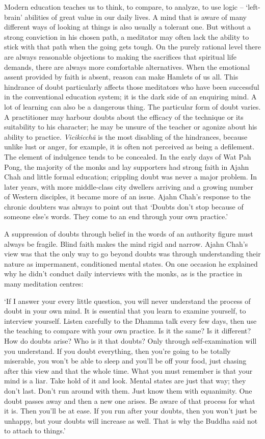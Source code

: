 Modern education teaches us to think, to compare, to analyze, to use
logic -- `left-brain' abilities of great value in our daily lives. A
mind that is aware of many different ways of looking at things is also
usually a tolerant one. But without a strong conviction in his chosen
path, a meditator may often lack the ability to stick with that path
when the going gets tough. On the purely rational level there are always
reasonable objections to making the sacrifices that spiritual life
demands, there are always more comfortable alternatives. When the
emotional assent provided by faith is absent, reason can make Hamlets of
us all. This hindrance of doubt particularly affects those meditators
who have been successful in the conventional education system; it is the
dark side of an enquiring mind. A lot of learning can also be a
dangerous thing. The particular form of doubt varies. A practitioner may
harbour doubts about the efficacy of the technique or its suitability to
his character; he may be unsure of the teacher or agonize about his
ability to practice. \emph{Vicikicchā} is the most disabling of the
hindrances, because unlike lust or anger, for example, it is often not
perceived as being a defilement. The element of indulgence tends to be
concealed. In the early days of Wat Pah Pong, the majority of the monks
and lay supporters had strong faith in Ajahn Chah and little formal
education; crippling doubt was never a major problem. In later years, 
with more middle-class city dwellers arriving and a growing number of
Western disciples, it became more of an issue. Ajahn Chah's response to
the chronic doubters was always to point out that `Doubts don't stop
because of someone else's words. They come to an end through your own
practice.'

A suppression of doubts through belief in the words of an authority
figure must always be fragile. Blind faith makes the mind rigid and
narrow. Ajahn Chah's view was that the only way to go beyond doubts was
through understanding their nature as impermanent, conditioned mental
states. On one occasion he explained why he didn't conduct daily
interviews with the monks, as is the practice in many meditation
centres: 

`If I answer your every little question, you will never understand the
process of doubt in your own mind. It is essential that you learn to
examine yourself, to interview yourself. Listen carefully to the Dhamma
talk every few days, then use the teaching to compare with your own
practice. Is it the same? Is it different? How do doubts arise? Who is
it that doubts? Only through self-examination will you understand. If
you doubt everything, then you're going to be totally miserable, you
won't be able to sleep and you'll be off your food, just chasing after
this view and that the whole time. What you must remember is that your
mind is a liar. Take hold of it and look. Mental states are just that
way; they don't last. Don't run around with them. Just know them with
equanimity. One doubt passes away and then a new one arises. Be aware of
that process for what it is. Then you'll be at ease. If you run after
your doubts, then you won't just be unhappy, but your doubts will
increase as well. That is why the Buddha said not to attach to things.'

